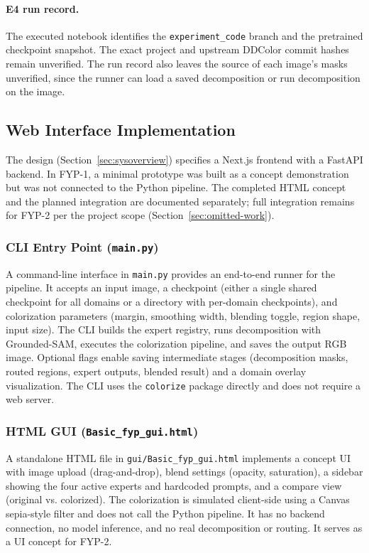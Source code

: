 \documentclass{FastFyp}
\begin{document}
\paragraph{E4 run record.} The executed notebook identifies the
\texttt{experiment\_code} branch and the pretrained checkpoint snapshot. The
exact project and upstream DDColor commit hashes remain unverified. The run
record also leaves the source of each image's masks unverified, since the
runner can load a saved decomposition or run decomposition on the image.

\subsection{Web Interface Implementation}
\label{subsec:web-interface}

The design (Section~\ref{sec:sysoverview}) specifies a Next.js frontend with a FastAPI backend. In FYP-1, a minimal prototype was built as a concept demonstration but was not connected to the Python pipeline. The completed HTML concept and the planned integration are documented separately; full integration remains for FYP-2 per the project scope (Section~\ref{sec:omitted-work}).

\subsubsection{CLI Entry Point (\texttt{main.py})}
A command-line interface in \texttt{main.py} provides an end-to-end runner for the pipeline. It accepts an input image, a checkpoint (either a single shared checkpoint for all domains or a directory with per-domain checkpoints), and colorization parameters (margin, smoothing width, blending toggle, region shape, input size). The CLI builds the expert registry, runs decomposition with Grounded-SAM, executes the colorization pipeline, and saves the output RGB image. Optional flags enable saving intermediate stages (decomposition masks, routed regions, expert outputs, blended result) and a domain overlay visualization. The CLI uses the \texttt{colorize} package directly and does not require a web server.

\subsubsection{HTML GUI (\texttt{Basic\_fyp\_gui.html})}
A standalone HTML file in \texttt{gui/Basic\_fyp\_gui.html} implements a concept UI with image upload (drag-and-drop), blend settings (opacity, saturation), a sidebar showing the four active experts and hardcoded prompts, and a compare view (original vs. colorized). The colorization is simulated client-side using a Canvas sepia-style filter and does not call the Python pipeline. It has no backend connection, no model inference, and no real decomposition or routing. It serves as a UI concept for FYP-2.
\end{document}
